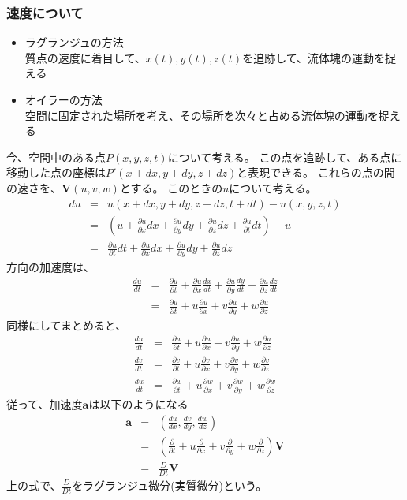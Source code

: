 \documentclass[a4j,twoside,openright,11pt]{jsarticle}
\begin{document}
\subsubsection{速度について}
\begin{itemize}
\item ラグランジュの方法\\
質点の速度に着目して、$x(t),y(t),z(t)$を追跡して、流体塊の運動を捉える
\item オイラーの方法\\
空間に固定された場所を考え、その場所を次々と占める流体塊の運動を捉える
\end{itemize}
今、空間中のある点$P(x,y,z,t)$について考える。
この点を追跡して、ある点に移動した点の座標は$P'(x+dx,y+dy,z+dz)$と表現できる。
これらの点の間の速さを、$\bm {V}(u,v,w)$とする。
このときの$u$について考える。\\
\begin{eqnarray}
du &=& u(x+dx,y+dy,z+dz,t+dt) - u(x,y,z,t)\\
   &=& (u+\frac{\partial u}{\partial x}dx+\frac{\partial u}{\partial y}dy+\frac{\partial u}{\partial z}dz+\frac{\partial u}{\partial t}dt)-u\\
   &=& \frac{\partial u}{\partial t}dt+\frac{\partial u}{\partial x}dx+\frac{\partial u}{\partial y}dy+\frac{\partial u}{\partial z}dz
\end{eqnarray}
方向の加速度は、
\begin{eqnarray}
\frac{du}{dt} &=& \frac{\partial u}{\partial t}+\frac{\partial u}{\partial x}\frac{dx}{dt}+\frac{\partial u}{\partial y}\frac{dy}{dt}+\frac{\partial u}{\partial z}\frac{dz}{dt}\\
              &=& \frac{\partial u}{\partial t}+u\frac{\partial u}{\partial x}+v\frac{\partial u}{\partial y}+w\frac{\partial u}{\partial z}
\end{eqnarray}
同様にしてまとめると、
\begin{eqnarray}
\frac{du}{dt} &=& \frac{\partial u}{\partial t}+u\frac{\partial u}{\partial x}+v\frac{\partial u}{\partial y}+w\frac{\partial u}{\partial z}\\
\frac{dv}{dt} &=& \frac{\partial v}{\partial t}+u\frac{\partial v}{\partial x}+v\frac{\partial v}{\partial y}+w\frac{\partial v}{\partial z}\\
\frac{dw}{dt} &=& \frac{\partial w}{\partial t}+u\frac{\partial w}{\partial x}+v\frac{\partial w}{\partial y}+w\frac{\partial w}{\partial z}
\end{eqnarray}
従って、加速度$\bm{a}$は以下のようになる
\begin{eqnarray}
\bm{a}&=&(\frac{du}{dx},\frac{dv}{dy},\frac{dw}{dz})\\
      &=&(\frac{\partial }{\partial t}+u\frac{\partial }{\partial x}+v\frac{\partial }{\partial y}+w\frac{\partial }{\partial z})\bm{V}\\
      &=&\frac{D}{Dt}\bm{V}
\end{eqnarray}
上の式で、$\frac{D}{Dt}$をラグランジュ微分(実質微分)という。
\end{document}
